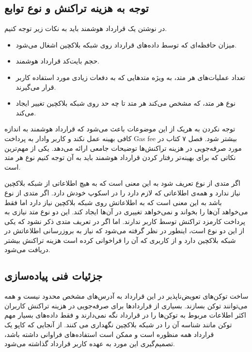 \subsection{توجه به هزینه تراکنش و نوع توابع}
در نوشتن یک قرارداد هوشمند باید به نکات زیر توجه کنیم.
\begin{itemize}
  \item
میزان حافظه‌ای که توسط داده‌های قرارداد روی شبکه بلاکچین اشغال می‌شود.
  \item
حجم بایت‌کد قرارداد هوشمند.
  \item
تعداد عملیات‌های هر متد، به ویژه متدهایی که به دفعات زیادی مورد استفاده کاربر قرار می‌گیرند.
  \item
نوع هر متد، که مشخص می‌کند هر متد تا چه حد روی شبکه بلاکچین تغییر ایجاد می‌کند.
\end{itemize}

توجه نکردن به هریک از این موضوعات باعث می‌شود که قرارداد هوشمند به اندازه کافی بهینه عمل نکند و کاربر وادار به پرداخت
\gls{Gas fee}
بیشتر شود. فصل ۷ کتاب
\cite{MasteringEthereum}
در مورد صرفه‌جویی در هزینه تراکنش‌ها توضیحات جامعی ارائه می‌دهد.
یکی از مهم‌ترین نکاتی که برای بهینه‌تر رفتار کردن قرارداد هوشمند
باید به آن توجه کنیم نوع هر متد است.

اگر متدی از نوع
تعریف شود به این معنی است که به هیچ اطلاعاتی از شبکه بلاکچین نیاز ندارد
و همه‌ی اطلاعاتی که لازم دارد را در اسکوپ
خودش دارد. اگر متدی از نوع
باشد به این معنی است که به اطلاعاتش روی شبکه بلاکچین نیاز دارد
اما فقط می‌خواهد آن‌ها را بخواند و نمی‌خواهد تغییری در آن‌ها ایجاد کند.
این دو نوع متد نیازی به پرداخت کارمزد تراکنش توسط کاربر ندارند.
اما اگر در تعریف متدی ذکر نشود که یکی از این دو نوع است، اینطور در نظر گرفته می‌شود
که نیاز به بروزرسانی اطلاعاتش در شبکه بلاکچین دارد
و از کاربری که آن را فراخوانی کرده است هزینه تراکنش بیشتر دریافت می‌شود.


\subsection{جزئیات فنی پیاده‌سازی}
ساخت توکن‌های تعویض‌ناپذیر در این قرارداد به آدرس‌های مشخص محدود نیست و همه می‌توانند توکن بسازند.
بسیاری از قراردادها برای صرفه‌جویی در هزینه تراکنش کاربران اکثر اطلاعات مربوط به توکن‌ها را در قرارداد نگه نمی‌دارند
و فقط داده‌های بسیار مهم توکن مانند شناسه آن را در شبکه بلاکچین نگهداری می کنند.
از آنجایی که کاپو یک قرارداد همه منظوره است و ممکن است استفاده‌های فراوانی داشته باشد،
تصمیم‌گیری این مورد به عهده کاربر قرارداد گذاشته می‌شود.


